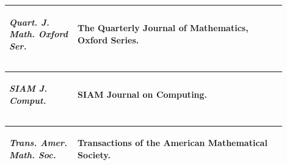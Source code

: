 \documentclass[11pt,reqno]{amsart}
\theoremstyle{blueplain}
\numberwithin{equation}{section}
\def\hyperlink#1#2{#2}}
\begin{document}
\par\setlength{\parskip}{0pt}\nointerlineskip
\noindent
\begin{tabular}{|@{}p{0.22500\linewidth}|p{0.67500\linewidth}|}\hline
\hypertarget{abbr:journal-Quart-J-Math-Oxford-Ser}{}\hyperlink{abbr-source:Ingham1937}{\emph{Quart. J. Math. Oxford Ser.}} & The Quarterly Journal of Mathematics, Oxford Series.\\\hline
\end{tabular}%
\par\setlength{\parskip}{0pt}\nointerlineskip
\noindent
\begin{tabular}{|@{}p{0.22500\linewidth}|p{0.67500\linewidth}|}\hline
\hypertarget{abbr:journal-SIAM-J-Comput}{}\hyperlink{abbr-source:Pratt1975}{\emph{SIAM J. Comput.}} & \hyperlink{abbr:SIAM}{SIAM} Journal on Computing.\\\hline
\end{tabular}%
\par\setlength{\parskip}{0pt}\nointerlineskip
\noindent
\begin{tabular}{|@{}p{0.22500\linewidth}|p{0.67500\linewidth}|}\hline
\hypertarget{abbr:journal-Trans-Amer-Math-Soc}{}\hyperlink{abbr-source:AvigadGerhardyTowsner2010}{\emph{Trans. Amer. Math. Soc.}} & Transactions of the American Mathematical Society.\\\hline
\end{tabular}\par
\endgroup

\endgroup
\end{document}
